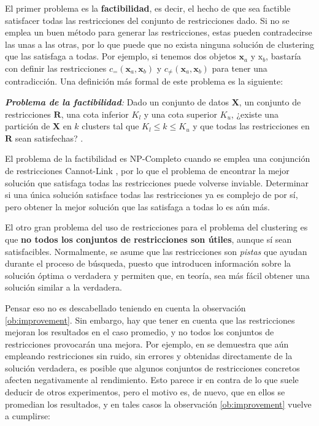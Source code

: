 El primer problema es la \textbf{factibilidad}, es decir, el hecho de que sea factible satisfacer todas las restricciones del conjunto de restricciones dado. Si no se emplea un buen método para generar las restricciones, estas pueden contradecirse las unas a las otras, por lo que puede que no exista ninguna solución de clustering que las satisfaga a todas. Por ejemplo, si tenemos dos objetos $\textbf{x}_a$ y $\text{x}_b$, bastaría con definir las restricciones $c_{=}(\textbf{x}_a,\textbf{x}_b)$ y $c_{\not =}(\textbf{x}_a,\textbf{x}_b)$ para tener una contradicción. Una definición más formal de este problema es la siguiente:

\begin{definicion}
 \emph{\textbf{Problema de la factibilidad}:} Dado un conjunto de datos $\textbf{X}$, un conjunto de restricciones $\textbf{R}$, una cota inferior $K_l$ y una cota superior $K_u$, ¿existe una partición de $\textbf{X}$ en $k$ clusters tal que $K_l \leq k \leq K_u$ y que todas las restricciones en $\textbf{R}$ sean satisfechas? \cite{davidson2007survey} \cite{davidson2005clustering}.
\end{definicion}

El problema de la factibilidad es NP-Completo cuando se emplea una conjunción de restricciones Cannot-Link \cite{davidson2007survey}, por lo que el problema de encontrar la mejor solución que satisfaga todas las restricciones puede volverse inviable. Determinar si una única solución satisface todas las restricciones ya es complejo de por sí, pero obtener la mejor solución que las satisfaga a todas lo es aún más.

El otro gran problema del uso de restricciones para el problema del clustering es que \textbf{no todos los conjuntos de restricciones son útiles}, aunque sí sean satisfacibles. Normalmente, se asume que las restricciones son \emph{pistas} que ayudan durante el proceso de búsqueda, puesto que introducen información sobre la solución óptima o verdadera y permiten que, en teoría, sea más fácil obtener una solución similar a la verdadera.

Pensar eso no es descabellado teniendo en cuenta la observación \ref{ob:improvement}. Sin embargo, hay que tener en cuenta que las restricciones mejoran los resultados en el caso promedio, y no todos los conjuntos de restricciones provocarán una mejora. Por ejemplo, en \cite{davidson2006measuring} se demuestra que aún empleando restricciones sin ruido, sin errores y obtenidas directamente de la solución verdadera, es posible que algunos conjuntos de restricciones concretos afecten negativamente al rendimiento. Esto parece ir en contra de lo que suele deducir de otros experimentos, pero el motivo es, de nuevo, que en ellos se promedian los resultados, y en tales casos la observación \ref{ob:improvement} vuelve a cumplirse:

